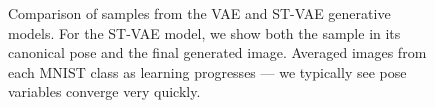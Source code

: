 

\begin{figure}[t]
\begin{center}
\qquad
{}\vspace{-3mm}
\end{center}
 \caption{\footnotesize
  Comparison of samples from the VAE and ST-VAE generative models.  
 For the ST-VAE model, we show both the sample in its canonical pose and the final generated image.
    Averaged images from each MNIST class as learning progresses ---
  we typically see pose variables converge very quickly.
 }
\end{figure}



